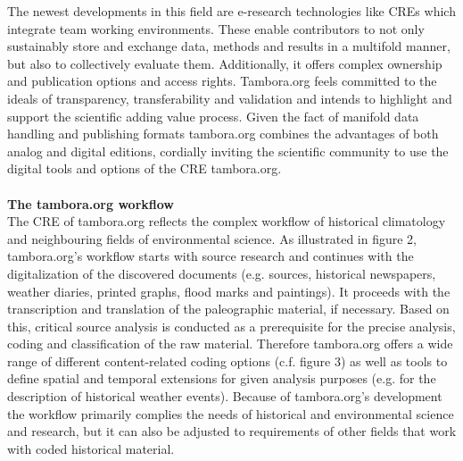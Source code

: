 The newest developments in this field are e-research technologies like CREs which integrate team working environments. These enable contributors to not only sustainably store and exchange data, methods and results in a multifold manner, but also to collectively evaluate them. Additionally, it offers complex ownership and publication options and access rights. Tambora.org feels committed to the ideals of transparency, transferability and validation and intends to highlight and support the scientific adding value process. Given the fact of manifold data handling and publishing formats tambora.org combines the advantages of both analog and digital editions, cordially inviting the scientific community to use the digital tools and options of the CRE tambora.org.
\\\\
\textbf{The tambora.org workflow}
\vspace{0.25cm}\\
The CRE of tambora.org reflects the complex workflow of historical climatology and neighbouring fields of environmental science. As illustrated in figure 2, tambora.org’s workflow starts with source research and continues with the digitalization of the discovered documents (e.g. sources, historical newspapers, weather diaries, printed graphs, flood marks and paintings). It proceeds with the transcription and translation of the paleographic material, if necessary. Based on this, critical source analysis is conducted as a prerequisite for the precise analysis, coding and classification of the raw material.  Therefore tambora.org offers a wide range of different content-related coding options (c.f. figure 3) as well as tools to define spatial and temporal extensions for given analysis purposes (e.g. for the description of historical weather events). Because of tambora.org’s development the workflow primarily complies the needs of historical and environmental science and research, but it can also be adjusted to requirements of other fields that work with coded historical material.
\vspace{0.25cm}\\
